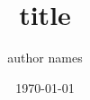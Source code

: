 \documentclass[draft]{beamer}
\title[short title]{title}
\author[short author names]{author names}
\institute[short institute names]{institute names}
\date{\today}
\begin{document}
\begin{frame}

\end{frame}
\end{document}
